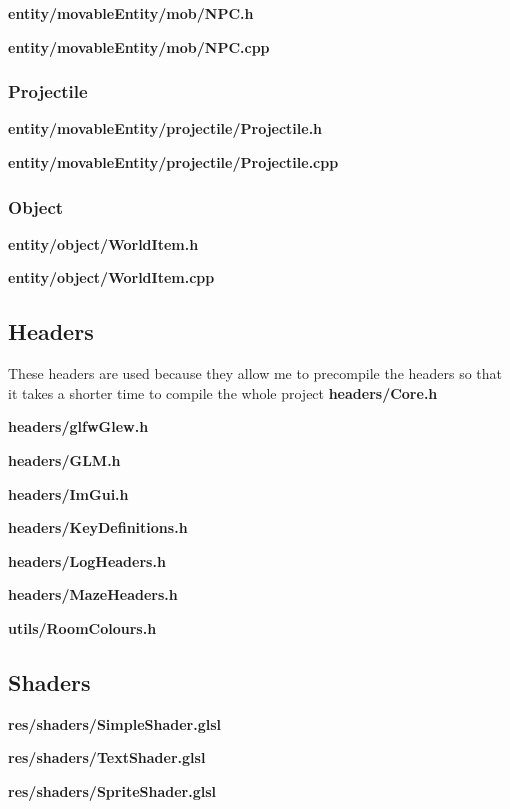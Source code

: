 \documentclass[../Main.tex]{subfiles}
\begin{document}
            \textbf{entity/movableEntity/mob/NPC.h}
            
            \textbf{entity/movableEntity/mob/NPC.cpp}
            

        \subsubsection{Projectile}
            \textbf{entity/movableEntity/projectile/Projectile.h}
            
            \textbf{entity/movableEntity/projectile/Projectile.cpp}
            

        \subsubsection{Object}
            \textbf{entity/object/WorldItem.h}
            
            \textbf{entity/object/WorldItem.cpp}
            

    \subsection{Headers}
        These headers are used because they allow me to precompile the headers so that it takes a shorter time to compile the whole project
        \textbf{headers/Core.h}
        
        \textbf{headers/glfwGlew.h}
        
        \textbf{headers/GLM.h}
        
        \textbf{headers/ImGui.h}
        
        \textbf{headers/KeyDefinitions.h}
        
        \textbf{headers/LogHeaders.h}
        
        \textbf{headers/MazeHeaders.h}
        
        \textbf{utils/RoomColours.h}
        

    \subsection{Shaders}
        \textbf{res/shaders/SimpleShader.glsl}
        
        \textbf{res/shaders/TextShader.glsl}
        
        \textbf{res/shaders/SpriteShader.glsl}
        
\end{document}
